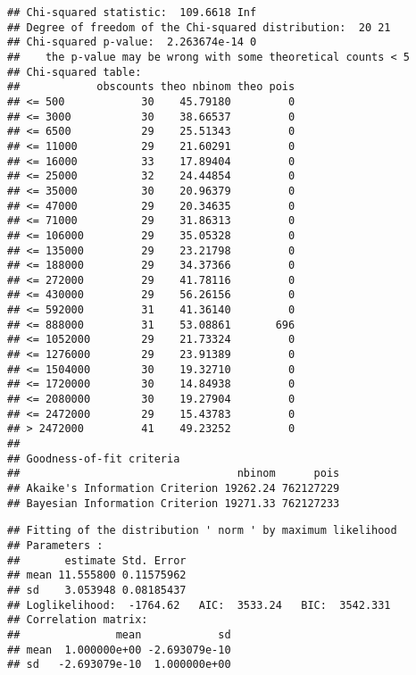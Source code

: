 \documentclass[
]{article}
\newenvironment{Shaded}{\begin{snugshade}}{\end{snugshade}}
\newcommand{\CommentTok}[1]{\textcolor[rgb]{0.56,0.35,0.01}{\textit{#1}}}
\newcommand{\FunctionTok}[1]{\textcolor[rgb]{0.00,0.00,0.00}{#1}}
\newcommand{\NormalTok}[1]{#1}
\newcommand{\OtherTok}[1]{\textcolor[rgb]{0.56,0.35,0.01}{#1}}
\newcommand{\SpecialCharTok}[1]{\textcolor[rgb]{0.00,0.00,0.00}{#1}}
\newcommand{\StringTok}[1]{\textcolor[rgb]{0.31,0.60,0.02}{#1}}
\begin{document}
\begin{verbatim}
## Chi-squared statistic:  109.6618 Inf 
## Degree of freedom of the Chi-squared distribution:  20 21 
## Chi-squared p-value:  2.263674e-14 0 
##    the p-value may be wrong with some theoretical counts < 5  
## Chi-squared table:
##            obscounts theo nbinom theo pois
## <= 500            30    45.79180         0
## <= 3000           30    38.66537         0
## <= 6500           29    25.51343         0
## <= 11000          29    21.60291         0
## <= 16000          33    17.89404         0
## <= 25000          32    24.44854         0
## <= 35000          30    20.96379         0
## <= 47000          29    20.34635         0
## <= 71000          29    31.86313         0
## <= 106000         29    35.05328         0
## <= 135000         29    23.21798         0
## <= 188000         29    34.37366         0
## <= 272000         29    41.78116         0
## <= 430000         29    56.26156         0
## <= 592000         31    41.36140         0
## <= 888000         31    53.08861       696
## <= 1052000        29    21.73324         0
## <= 1276000        29    23.91389         0
## <= 1504000        30    19.32710         0
## <= 1720000        30    14.84938         0
## <= 2080000        30    19.27904         0
## <= 2472000        29    15.43783         0
## > 2472000         41    49.23252         0
## 
## Goodness-of-fit criteria
##                                  nbinom      pois
## Akaike's Information Criterion 19262.24 762127229
## Bayesian Information Criterion 19271.33 762127233
\end{verbatim}

\begin{Shaded}
\end{Shaded}

\begin{verbatim}
## Fitting of the distribution ' norm ' by maximum likelihood 
## Parameters : 
##       estimate Std. Error
## mean 11.555800 0.11575962
## sd    3.053948 0.08185437
## Loglikelihood:  -1764.62   AIC:  3533.24   BIC:  3542.331 
## Correlation matrix:
##               mean            sd
## mean  1.000000e+00 -2.693079e-10
## sd   -2.693079e-10  1.000000e+00
\end{verbatim}
\end{document}
